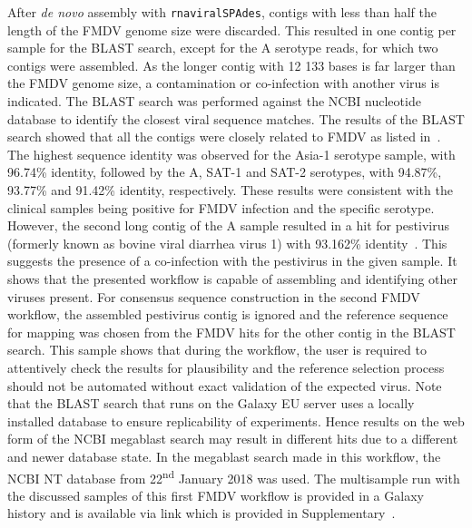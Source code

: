 After \textit{de novo} assembly with \texttt{rnaviralSPAdes}, contigs with less than half the length of the \ac{FMDV} genome size were discarded. This resulted in one contig per sample for the \ac{BLAST} search, except for the A serotype reads, for which two contigs were assembled. As the longer contig with 12 133 bases is far larger than the \ac{FMDV} genome size, a contamination or co-infection with another virus is indicated. The \ac{BLAST} search was performed against the \ac{NCBI} nucleotide database to identify the closest viral sequence matches. The results of the \ac{BLAST} search showed that all the contigs were closely related to \ac{FMDV} as listed in~. The highest sequence identity was observed for the Asia-1 serotype sample, with 96.74\% identity, followed by the A, SAT-1 and SAT-2 serotypes, with 94.87\%, 93.77\% and 91.42\% identity, respectively. These results were consistent with the clinical samples being positive for \ac{FMDV} infection and the specific serotype. However, the second long contig of the A sample resulted in a hit for pestivirus (formerly known as bovine viral diarrhea virus 1) with 93.162\% identity~\cite{smith2017proposed}. This suggests the presence of a co-infection with the pestivirus in the given sample. It shows that the presented workflow is capable of assembling and identifying other viruses present. For consensus sequence construction in the second \ac{FMDV} workflow, the assembled pestivirus contig is ignored and the reference sequence for mapping was chosen from the \ac{FMDV} hits for the other contig in the \ac{BLAST} search. This sample shows that during the workflow, the user is required to attentively check the results for plausibility and the reference selection process should not be automated without exact validation of the expected virus. Note that the \ac{BLAST} search that runs on the Galaxy EU server uses a locally installed database to ensure replicability of experiments. Hence results on the web form of the \ac{NCBI} megablast search may result in different hits due to a different and newer database state. In the megablast search made in this workflow, the \ac{NCBI} NT database from 22\textsuperscript{nd} January 2018 was used. The multisample run with the discussed samples of this first \ac{FMDV} workflow is provided in a Galaxy history and is available via link which is provided in Supplementary~.\\

